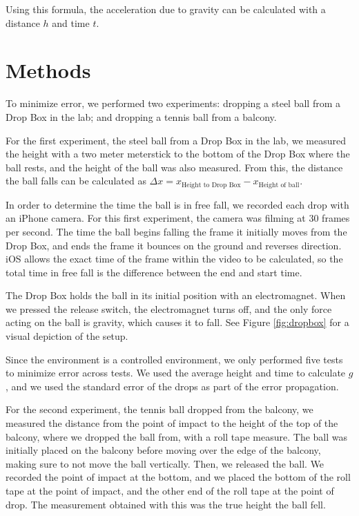 \documentclass[12pt]{article}
\begin{document}
Using this formula, the acceleration due to gravity can be calculated with a distance \(h\) and time \(t\).
\section{Methods}
\label{sec:org1a14315}

To minimize error, we performed two experiments: dropping a steel ball from a Drop Box in the lab; and dropping a tennis ball from a balcony.

For the first experiment, the steel ball from a Drop Box in the lab, we measured the height with a two meter meterstick to the bottom of the Drop Box where the ball rests, and the height of the ball was also measured. From this, the distance the ball falls can be calculated as \(\Delta x = x_{\text{Height to Drop Box}} - x_{\text{Height of ball}}\).

In order to determine the time the ball is in free fall, we recorded each drop with an iPhone camera. For this first experiment, the camera was filming at 30 frames per second. The time the ball begins falling the frame it initially moves from the Drop Box, and ends the frame it bounces on the ground and reverses direction. iOS allows the exact time of the frame within the video to be calculated, so the total time in free fall is the difference between the end and start time.

The Drop Box holds the ball in its initial position with an electromagnet. When we pressed the release switch, the electromagnet turns off, and the only force acting on the ball is gravity, which causes it to fall. See Figure \ref{fig:dropbox} for a visual depiction of the setup.

Since the environment is a controlled environment, we only performed five tests to minimize error across tests. We used the average height and time to calculate \(g\), and we used the standard error of the drops as part of the error propagation.

For the second experiment, the tennis ball dropped from the balcony, we measured the distance from the point of impact to the height of the top of the balcony, where we dropped the ball from, with a roll tape measure. The ball was initially placed on the balcony before moving over the edge of the balcony, making sure to not move the ball vertically. Then, we released the ball. We recorded the point of impact at the bottom, and we placed the bottom of the roll tape at the point of impact, and the other end of the roll tape at the point of drop. The measurement obtained with this was the true height the ball fell.
\end{document}
